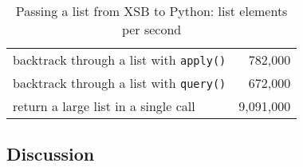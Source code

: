 \begin{table}[hbt] \label{table:janus-py-throughput}
  \begin{centering}
\begin{tabular}{lr} \hline
backtrack through a list with {\tt apply()}          &   782,000\\
backtrack through a list with {\tt query()}          &   672,000 \\ 
return a large list in a single call                 & 9,091,000\\\hline 
\end{tabular}
\caption{Passing a list from XSB to Python: list elements per second}
\end{centering}
\end{table}

%

\subsection{Discussion}

